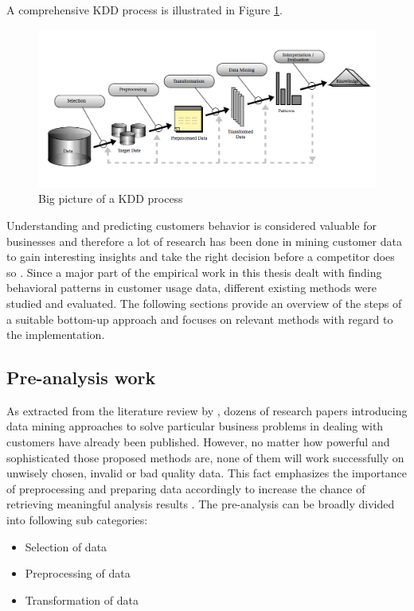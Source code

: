 A comprehensive KDD process is illustrated in Figure \ref{fig:kddProcess}.

\begin{figure}
	\centering
	\includegraphics[width=1.0\textwidth]{img/kdd.png}
	\caption{Big picture of a KDD process \cite{fayyad1996data}}
	\label{fig:kddProcess}
\end{figure} 

Understanding and predicting customers behavior is considered valuable for businesses and therefore a lot of research has been done in mining customer data to gain interesting insights and take the right decision before a competitor does so \cite{Ngai2009}. Since a major part of the empirical work in this thesis dealt with finding behavioral patterns in customer usage data, different existing methods were studied and evaluated. The following sections provide an overview of the steps of a suitable bottom-up approach and focuses on relevant methods with regard to the implementation.

\subsection{Pre-analysis work}
As extracted from the literature review by \cite{Ngai2009}, dozens of research papers introducing data mining approaches to solve particular business problems in dealing with customers have already been published. However, no matter how powerful and sophisticated those proposed methods are, none of them will work successfully on unwisely chosen, invalid or bad quality data. This fact emphasizes the importance of preprocessing and preparing data accordingly to increase the chance of retrieving meaningful analysis results \cite{neckel2015} \cite{knobloch2000data}. The pre-analysis can be broadly divided into following sub categories:

\begin{itemize}
	\item Selection of data
	\item Preprocessing of data
	\item Transformation of data
\end{itemize}

